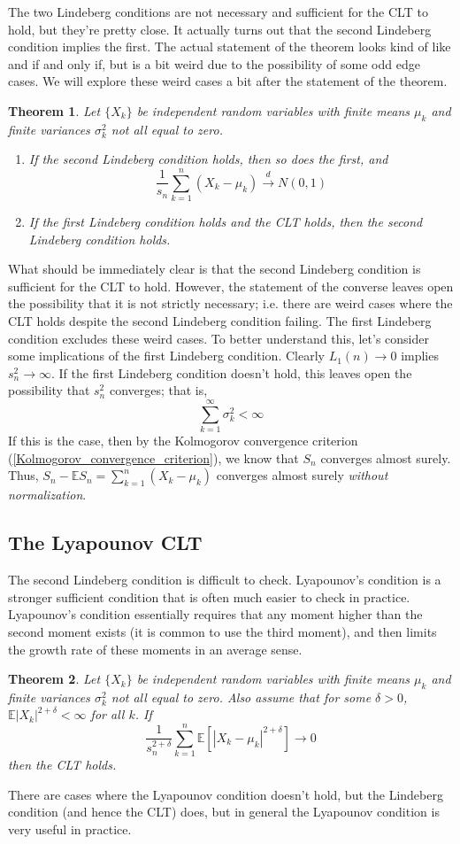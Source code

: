 \documentclass[12pt]{article}
\newcommand*{\abs}[1]{\left\lvert#1\right\rvert}
\newcommand{\E}{\mathbb{E}}
\newtheorem{thm}{Theorem}
\begin{document}
The two Lindeberg conditions are not necessary and sufficient for the CLT to hold, but they're pretty close. It actually turns out that the second Lindeberg condition implies the first. 
The actual statement of the theorem looks kind of like and if and only if, but is a bit weird due to the possibility of some odd edge cases. We will explore these weird cases a bit after
the statement of the theorem. 
\begin{thm}
Let $\{X_k\}$ be independent random variables with finite means $\mu_k$ and finite variances $\sigma_k^2$ not all equal to zero. 
\begin{enumerate}
\item If the second Lindeberg condition holds, then so does the first, and 
\[\frac{1}{s_n} \sum_{k = 1}^{n} (X_k - \mu_k) \overset{d}{\to} N(0, 1)\]
\item If the first Lindeberg condition holds and the CLT holds, then the second Lindeberg condition holds. 
\end{enumerate}
\end{thm}
What should be immediately clear is that the second Lindeberg condition is sufficient for the CLT to hold. However, the statement of the converse leaves open the possibility that 
it is not strictly necessary; i.e. there are weird cases where the CLT holds despite the second Lindeberg condition failing. The first Lindeberg condition excludes these weird cases. To better
understand this, let's consider some implications of the first Lindeberg condition. Clearly $L_1(n) \to 0$ implies $s_n^2 \to \infty$. If the first Lindeberg condition doesn't hold, this leaves open 
the possibility that $s_n^2$ converges; that is, 
\[\sum_{k = 1}^{\infty} \sigma_k^2 < \infty\]
If this is the case, then by the Kolmogorov convergence criterion (\ref{Kolmogorov_convergence_criterion}), we know that $S_n$ converges almost surely. Thus, 
$S_n - \E S_n = \sum_{k = 1}^{n} (X_k - \mu_k)$ converges almost surely \textit{without normalization}. 

\subsection{The Lyapounov CLT}
The second Lindeberg condition is difficult to check. Lyapounov's condition is a stronger sufficient condition that is often much easier to check in practice. Lyapounov's condition essentially 
requires that any moment higher than the second moment exists (it is common to use the third moment), and then limits the growth rate of these moments in an average sense. 
\begin{thm}
Let $\{X_k\}$ be independent random variables with finite means $\mu_k$ and finite variances $\sigma_k^2$ not all equal to zero. Also assume that for some $\delta > 0$, 
$\E \abs{X_k}^{2 + \delta} < \infty$ for all $k$. If 
\[\frac{1}{s_n^{2 + \delta}} \sum_{k = 1}^{n} \E\left[\abs{X_k - \mu_k}^{2 + \delta}\right] \to 0\]
then the CLT holds. 
\end{thm}
There are cases where the Lyapounov condition doesn't hold, but the Lindeberg condition (and hence the CLT) does, but in general the Lyapounov condition is very useful in practice. 
\end{document}
